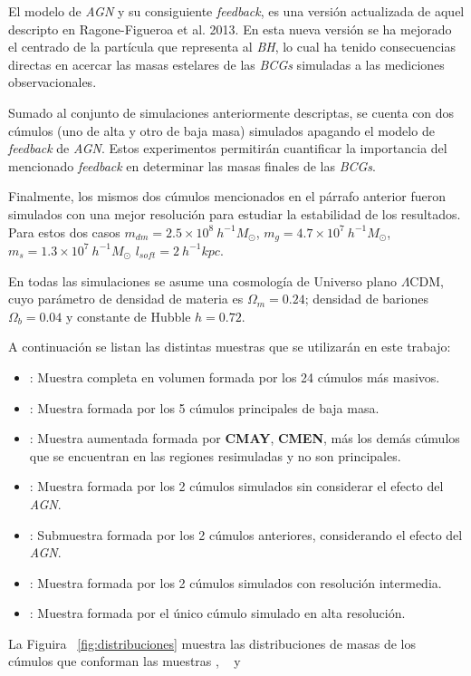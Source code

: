 El modelo de {\it AGN} y su consiguiente {\it feedback}, es una versi\'on actualizada de aquel descripto en Ragone-Figueroa 
et al. 2013. En esta nueva versi\'on se ha mejorado el centrado de la part\'icula que representa al {\it BH}, lo cual ha tenido 
consecuencias directas en acercar las masas estelares de las {\it BCGs} simuladas a las mediciones observacionales. 

Sumado al conjunto de simulaciones anteriormente descriptas, se cuenta con dos c\'umulos (uno de alta y otro de baja masa) simulados
apagando el modelo de {\it feedback} de {\it AGN}.
Estos experimentos permitir\'an cuantificar la importancia del mencionado
{\it feedback} en determinar las masas finales de las {\it BCGs}.

Finalmente, los mismos dos c\'umulos mencionados en el p\'arrafo anterior fueron simulados con una mejor resoluci\'on 
para estudiar la estabilidad de los resultados. Para estos dos
casos $m_{dm}=2.5\times10^8~h^{-1}M_{\odot}$, 
$m_{g}=4.7\times10^7~h^{-1}M_{\odot}$,
$m_{s}=1.3\times10^7~h^{-1}M_{\odot}$  $l_{soft}=2~h^{-1}kpc$. 

En todas las simulaciones se asume una cosmolog\'ia de Universo plano $\Lambda$CDM, cuyo par\'ametro de 
densidad de materia es $\Omega_m=0.24$; densidad de bariones $\Omega_b=0.04$ y constante de Hubble $h=0.72$.

\medskip
A continuaci\'on se listan las distintas muestras que se utilizar\'an en este trabajo:

\begin{itemize}

\item \cmay: Muestra completa en volumen formada por los 24 c\'umulos m\'as masivos. 
\item \cmen: Muestra formada por los 5 c\'umulos principales de baja masa. 
\item \aum: Muestra aumentada formada por {\bf CMAY}, {\bf CMEN}, m\'as
los dem\'as c\'umulos que se encuentran en las regiones resimuladas y no son principales. 
\item \agnoff: Muestra formada por los 2 c\'umulos simulados sin considerar el efecto del {\it AGN}.
\item \agnon: Submuestra formada por los 2 c\'umulos anteriores, considerando el efecto del {\it AGN}.
\item \mr: Muestra formada por los 2 c\'umulos simulados con resoluci\'on intermedia.
\item \hr: Muestra formada por el \'unico c\'umulo simulado en alta resoluci\'on.

\end{itemize}
La Figuira ~\ref{fig:distribuciones} muestra las distribuciones de masas 
de los c\'umulos que conforman las muestras \cmay, \cmen~ y \aum


